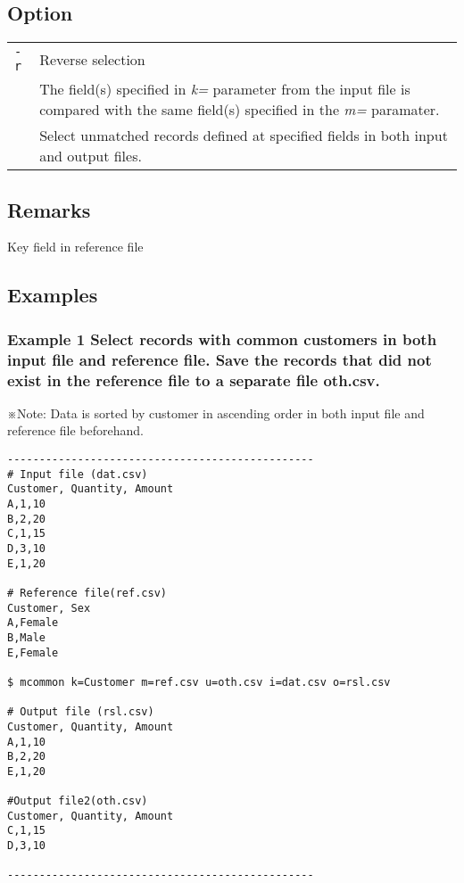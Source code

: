 \documentclass[a4paper]{jarticle}
\begin{document}
\subsection*{Option}
\begin{table}[htbp]
{\small
\begin{tabular}{ll}
\verb|-r|  & Reverse selection\\
& The field(s) specified in \emph{k=} parameter from the input file is compared with the same field(s) specified in the \emph{m=} paramater. \\
& Select unmatched records defined at specified fields in both input and output files. \\
\end{tabular} 
}
\end{table} 

\subsection*{Remarks}
Key field in reference file

\subsection*{Examples}
\subsubsection*{Example 1 Select records with common customers in both input file and reference file. Save the records that did not exist in the reference file to a separate file oth.csv.}
\noindent
※Note: Data is sorted by customer in ascending order in both input file and reference file beforehand.

\begin{verbatim}
------------------------------------------------
# Input file (dat.csv)
Customer, Quantity, Amount
A,1,10
B,2,20
C,1,15
D,3,10
E,1,20

# Reference file(ref.csv)
Customer, Sex
A,Female
B,Male
E,Female

$ mcommon k=Customer m=ref.csv u=oth.csv i=dat.csv o=rsl.csv

# Output file (rsl.csv)
Customer, Quantity, Amount
A,1,10
B,2,20
E,1,20

#Output file2(oth.csv)
Customer, Quantity, Amount
C,1,15
D,3,10

------------------------------------------------
\end{verbatim}
\end{document}
